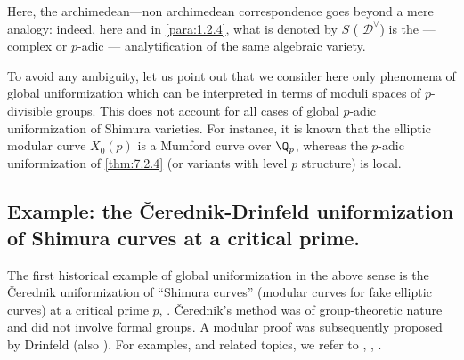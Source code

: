 \begin{para}
Here, the archimedean---non archimedean correspondence goes beyond a mere
analogy: indeed, here and in \ref{para:1.2.4}, what is denoted by $S$ (\resp
$\mathcal{D}^\vee $) is the --- complex or $p$-adic --- analytification of
the same algebraic variety.

\medskip
{} To avoid any ambiguity, let us point out
that we consider here only phenomena of global uniformization which can
be interpreted in terms of moduli spaces of $p$-divisible groups. This
does not account for all cases of global $p$-adic uniformization of
Shimura varieties. For instance, it is known that the elliptic modular
curve $X_0(p)$ is a Mumford curve over $\Q_p$, whereas the $p$-adic
uniformization of \ref{thm:7.2.4} (or variants with level $p$ structure)
is local.
\end{para}



\subsection{Example: the \v{C}erednik-Drinfeld uniformization of
Shimura curves at a critical prime.}\label{sub:7.4}

\begin{para}\label{para:7.4.1}
 The first historical example of global uniformization in the above
 sense is the \v{C}erednik uniformization of ``Shimura
 curves'' (modular curves for fake elliptic curves) at a critical prime
 $p$, \cf \cite{uoacbdsopwcq}.  \v{C}erednik's method was
 of group-theoretic nature and did not involve formal groups. A modular
 proof was subsequently proposed by Drinfeld \cite{copsr} (\cf also
 \cite[III]{updcds}). For examples, and related topics, we refer to
 \cite{van89:_les_shimur}, \cite{van92:_discr_mumfor}, \cite{van92:_unifor}.
\end{para}

